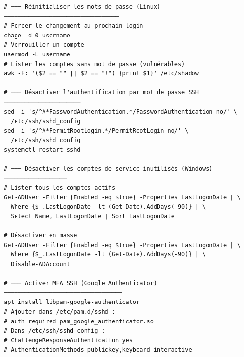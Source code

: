 \begin{lstlisting}[style=StyleTerminal,
  caption={Commandes de durcissement post-incident},
  label={lst:tools-hardening}]
# ─── Réinitialiser les mots de passe (Linux) ─────────────────────────────────
# Forcer le changement au prochain login
chage -d 0 username
# Verrouiller un compte
usermod -L username
# Lister les comptes sans mot de passe (vulnérables)
awk -F: '($2 == "" || $2 == "!") {print $1}' /etc/shadow

# ─── Désactiver l'authentification par mot de passe SSH ──────────────────────
sed -i 's/^#*PasswordAuthentication.*/PasswordAuthentication no/' \
  /etc/ssh/sshd_config
sed -i 's/^#*PermitRootLogin.*/PermitRootLogin no/' \
  /etc/ssh/sshd_config
systemctl restart sshd

# ─── Désactiver les comptes de service inutilisés (Windows) ──────────────────
# Lister tous les comptes actifs
Get-ADUser -Filter {Enabled -eq $true} -Properties LastLogonDate | \
  Where {$_.LastLogonDate -lt (Get-Date).AddDays(-90)} | \
  Select Name, LastLogonDate | Sort LastLogonDate

# Désactiver en masse
Get-ADUser -Filter {Enabled -eq $true} -Properties LastLogonDate | \
  Where {$_.LastLogonDate -lt (Get-Date).AddDays(-90)} | \
  Disable-ADAccount

# ─── Activer MFA SSH (Google Authenticator) ──────────────────────────────────
apt install libpam-google-authenticator
# Ajouter dans /etc/pam.d/sshd :
# auth required pam_google_authenticator.so
# Dans /etc/ssh/sshd_config :
# ChallengeResponseAuthentication yes
# AuthenticationMethods publickey,keyboard-interactive
\end{lstlisting}
